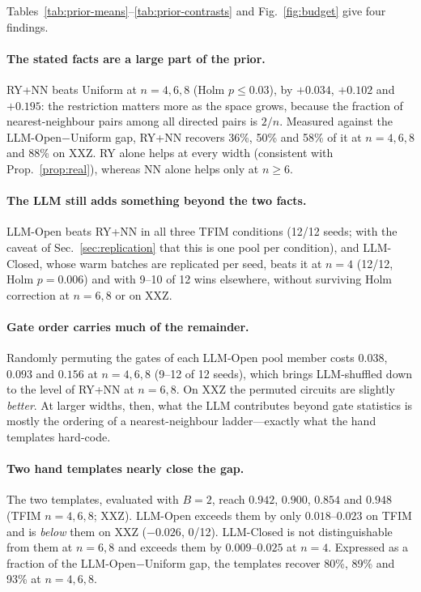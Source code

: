 \documentclass[11pt]{article}
\begin{document}
Tables~\ref{tab:prior-means}--\ref{tab:prior-contrasts} and Fig.~\ref{fig:budget}
give four findings.

\paragraph{The stated facts are a large part of the prior.}
RY+NN beats Uniform at $n=4,6,8$ (Holm $p\le0.03$), by $+0.034$, $+0.102$ and
$+0.195$: the restriction matters more as the space grows, because the fraction of
nearest-neighbour pairs among all directed pairs is $2/n$. Measured against the
LLM-Open$-$Uniform gap, RY+NN recovers 36\%, 50\% and 58\% of it at $n=4,6,8$ and 88\% on
XXZ. RY alone helps at every width (consistent with Prop.~\ref{prop:real}), whereas NN
alone helps only at $n\ge6$.

\paragraph{The LLM still adds something beyond the two facts.}
LLM-Open beats RY+NN in all three TFIM conditions (12/12 seeds; with the caveat of
Sec.~\ref{sec:replication} that this is one pool per condition), and LLM-Closed, whose
warm batches are replicated per seed, beats it at $n=4$ (12/12, Holm $p=0.006$) and
with 9--10 of 12 wins elsewhere, without surviving Holm correction at $n=6,8$ or on XXZ.

\paragraph{Gate order carries much of the remainder.}
Randomly permuting the gates of each LLM-Open pool member costs $0.038$, $0.093$ and
$0.156$ at $n=4,6,8$ (9--12 of 12 seeds), which brings LLM-shuffled down to the level of
RY+NN at $n=6,8$. On XXZ the permuted circuits are slightly \emph{better}. At larger
widths, then, what the LLM contributes beyond gate statistics is mostly the ordering
of a nearest-neighbour ladder---exactly what the hand templates hard-code.

\paragraph{Two hand templates nearly close the gap.}
The two templates, evaluated with $B=2$, reach $0.942$, $0.900$, $0.854$ and $0.948$
(TFIM $n=4,6,8$; XXZ). LLM-Open exceeds them by only $0.018$--$0.023$ on TFIM and is
\emph{below} them on XXZ ($-0.026$, 0/12). LLM-Closed is not distinguishable from them
at $n=6,8$ and exceeds them by $0.009$--$0.025$ at $n=4$. Expressed as a fraction of the
LLM-Open$-$Uniform gap, the templates recover 80\%, 89\% and 93\% at $n=4,6,8$.
\end{document}
